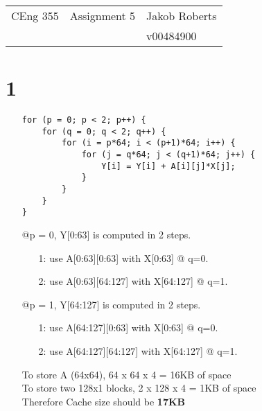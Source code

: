 \documentclass[10pt]{article}
\begin{document}
	\begin{center}
		\begin{tabularx}{\textwidth}{>{\raggedright}X>{\setlength\hsize{1\hsize}\centering}X>{\raggedleft}X}     
			CEng 355            &    {\huge Assignment 5 }            &    Jakob Roberts\tabularnewline
			&    {\small  }              		  &    v00484900\tabularnewline
		\end{tabularx}    
	\end{center}  
	\vspace{10mm}
	\renewcommand{\arraystretch}{1.6}
	\section*{1}
	\begin{itemize}
		\item []
		\begin{lstlisting}
for (p = 0; p < 2; p++) {	
	for (q = 0; q < 2; q++) {
		for (i = p*64; i < (p+1)*64; i++) {
			for (j = q*64; j < (q+1)*64; j++) {
				Y[i] = Y[i] + A[i][j]*X[j];
			}
		}
	}
}
		\end{lstlisting}
		@p = 0, Y[0:63] is computed in 2 steps.
		\begin{itemize}
			\item [1:]
			use A[0:63][0:63] with X[0:63] @ q=0.
			\item [2:]
			use A[0:63][64:127] with X[64:127] @ q=1.
		\end{itemize}
		@p = 1, Y[64:127] is computed in 2 steps. 
		\begin{itemize}
			\item [1:]
			use A[64:127][0:63] with X[0:63] @ q=0.
			\item [2:]
			use A[64:127][64:127] with X[64:127] @ q=1.
		\end{itemize}
		
		To store A (64x64), 64 x 64 x 4 = 16KB of space\\
		To store two 128x1 blocks, 2 x 128 x 4 = 1KB of space\\
		Therefore Cache size should be \textbf{17KB}\\
	\end{itemize}
\end{document}
